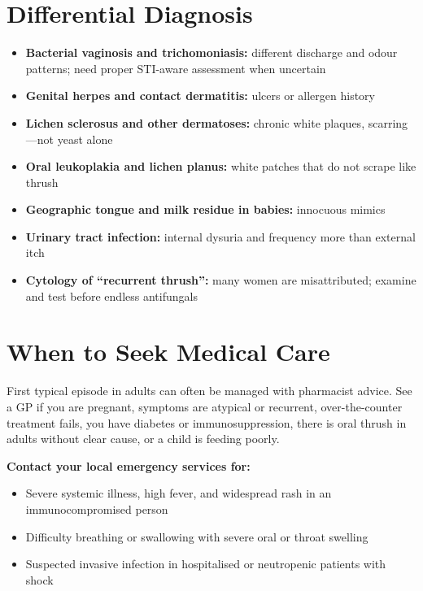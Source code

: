 \section*{Differential Diagnosis}
\begin{itemize}
    \item \textbf{Bacterial vaginosis and trichomoniasis:} different discharge and odour patterns; need proper STI-aware assessment when uncertain
    \item \textbf{Genital herpes and contact dermatitis:} ulcers or allergen history
    \item \textbf{Lichen sclerosus and other dermatoses:} chronic white plaques, scarring---not yeast alone
    \item \textbf{Oral leukoplakia and lichen planus:} white patches that do not scrape like thrush
    \item \textbf{Geographic tongue and milk residue in babies:} innocuous mimics
    \item \textbf{Urinary tract infection:} internal dysuria and frequency more than external itch
    \item \textbf{Cytology of ``recurrent thrush'':} many women are misattributed; examine and test before endless antifungals
\end{itemize}

\section*{When to Seek Medical Care}
First typical episode in adults can often be managed with pharmacist advice. See a GP if you are pregnant, symptoms are atypical or recurrent, over-the-counter treatment fails, you have diabetes or immunosuppression, there is oral thrush in adults without clear cause, or a child is feeding poorly.

\textbf{Contact your local emergency services for:}
\begin{itemize}
    \item Severe systemic illness, high fever, and widespread rash in an immunocompromised person
    \item Difficulty breathing or swallowing with severe oral or throat swelling
    \item Suspected invasive infection in hospitalised or neutropenic patients with shock
\end{itemize}


